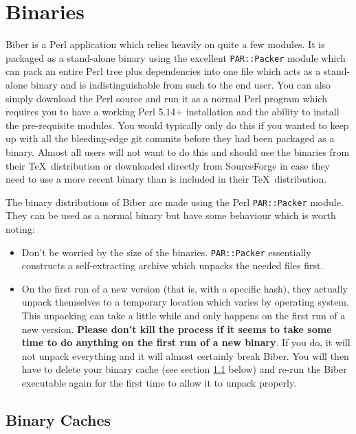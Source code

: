 \documentclass{ltxdockit}
\begin{document}
\section{Binaries}\label{binaries}

Biber is a Perl application which relies heavily on quite a few
modules. It is packaged as a stand-alone binary using the excellent
\verb+PAR::Packer+ module which can pack an entire Perl tree plus
dependencies into one file which acts as a stand-alone binary and is
indistinguishable from such to the end user. You can also simply download
the Perl source and run it as a normal Perl program which
requires you to have a working Perl 5.14+ installation and the
ability to install the pre-requisite modules. You would typically only do
this if you wanted to keep up with all the bleeding-edge git commits before
they had been packaged as a binary. Almost all users will not want to do
this and should use the binaries from their \TeX\ distribution or downloaded
directly from SourceForge in case they need to use a more recent binary
than is included in their \TeX\ distribution.

The binary distributions of Biber are made using the Perl \verb+PAR::Packer+
module. They can be used as a normal binary but have some behaviour which
is worth noting:

\begin{itemize}
\item Don't be worried by the size of the binaries. \verb+PAR::Packer+ essentially
  constructs a self-extracting archive which unpacks the needed files first.
\item On the first run of a new version (that is, with a specific hash),
  they actually unpack themselves to a temporary location which varies by
  operating system. This unpacking can take a little while and only happens
  on the first run of a new version. \textbf{Please don't kill the process
    if it seems to take some time to do anything on the first run of a new
    binary}. If you do, it will not unpack everything and it will almost
  certainly break Biber. You will then have to delete your binary
  cache (see section \ref{bc} below) and re-run the Biber executable
  again for the first time to allow it to unpack properly.
\end{itemize}

\subsection{Binary Caches}\label{bc}
\end{document}
